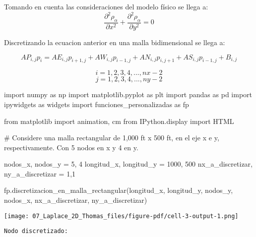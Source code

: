 \documentclass[
  letterpaper,
  DIV=11,
  numbers=noendperiod]{scrreprt}
\newenvironment{Shaded}{\begin{snugshade}}{\end{snugshade}}
\newcommand{\CommentTok}[1]{\textcolor[rgb]{0.37,0.37,0.37}{#1}}
\newcommand{\DecValTok}[1]{\textcolor[rgb]{0.68,0.00,0.00}{#1}}
\newcommand{\ImportTok}[1]{\textcolor[rgb]{0.00,0.46,0.62}{#1}}
\newcommand{\NormalTok}[1]{\textcolor[rgb]{0.00,0.23,0.31}{#1}}
\newcommand{\OperatorTok}[1]{\textcolor[rgb]{0.37,0.37,0.37}{#1}}
\begin{document}
Tomando en cuenta las consideraciones del modelo físico se llega a:
\[\frac{\partial^2 \rho_\alpha}{\partial x^2} + \frac{\partial^2 \rho_\alpha}{\partial y^2} = 0\]

Discretizando la ecuacion anterior en una malla bidimensional se llega
a:

\[AP_{i,j}p_i = AE_{i,j}p_{i+1, j}+ AW_{i,j}p_{i-1, j} + AN_{i,j}p_{i,j+1} + AS_{i,j}p_{i-1, j} + B_{i,j}\]

\[i = 1,2,3,4,...,nx-2\] \[j = 1,2,3,4,...,ny-2\]

\begin{Shaded}
\begin{Highlighting}[]
\ImportTok{import}\NormalTok{ numpy }\ImportTok{as}\NormalTok{ np}
\ImportTok{import}\NormalTok{ matplotlib.pyplot }\ImportTok{as}\NormalTok{ plt}
\ImportTok{import}\NormalTok{ pandas }\ImportTok{as}\NormalTok{ pd}
\ImportTok{import}\NormalTok{ ipywidgets }\ImportTok{as}\NormalTok{ widgets}
\ImportTok{import}\NormalTok{ funciones\_personalizadas }\ImportTok{as}\NormalTok{ fp}

\ImportTok{from}\NormalTok{ matplotlib }\ImportTok{import}\NormalTok{ animation, cm}
\ImportTok{from}\NormalTok{ IPython.display }\ImportTok{import}\NormalTok{ HTML}
\end{Highlighting}
\end{Shaded}

\begin{Shaded}
\begin{Highlighting}[]
\CommentTok{\# Considere una malla rectangular de 1,000 ft x 500 ft, en el eje x e y, respectivamente. Con 5 nodos en x y 4 en y.}

\NormalTok{nodos\_x, nodos\_y }\OperatorTok{=} \DecValTok{5}\NormalTok{, }\DecValTok{4}
\NormalTok{longitud\_x, longitud\_y }\OperatorTok{=} \DecValTok{1000}\NormalTok{, }\DecValTok{500}
\NormalTok{nx\_a\_discretizar, ny\_a\_discretizar }\OperatorTok{=} \DecValTok{1}\NormalTok{,}\DecValTok{1}

\NormalTok{fp.discretizacion\_en\_malla\_rectangular(longitud\_x, longitud\_y, nodos\_y, nodos\_x, nx\_a\_discretizar, ny\_a\_discretizar)}
\end{Highlighting}
\end{Shaded}

\texttt{[image: 07\_Laplace\_2D\_Thomas\_files/figure-pdf/cell-3-output-1.png]}

\begin{verbatim}
Nodo discretizado: 
\end{verbatim}
\end{document}
